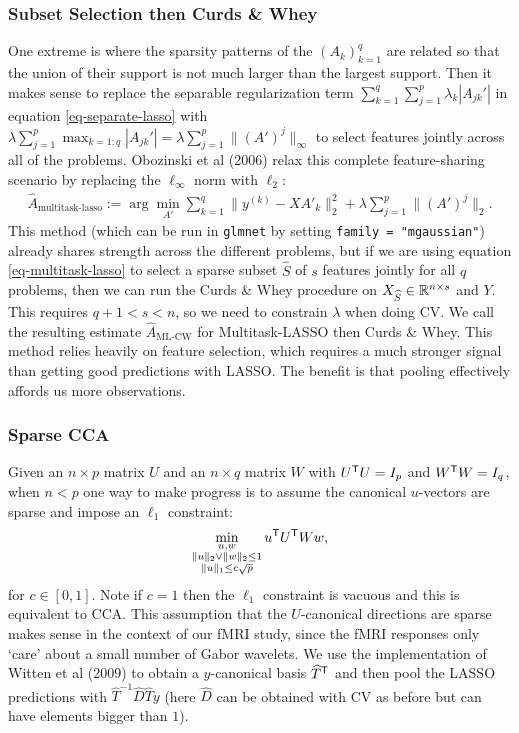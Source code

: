 \documentclass[main]{subfiles}
\begin{document}
\subsubsection{Subset Selection then Curds \& Whey}

One extreme is where the sparsity patterns of the $(A_k)_{k=1}^q$ are related so that the union of their support is not much larger than the largest support. Then it makes sense to replace the separable regularization term $\sum_{k=1}^q\sum_{j=1}^p \lambda_k|A_{jk}'|$ in equation \eqref{eq-separate-lasso} with $\lambda\sum_{j=1}^p \max_{k=1:q}|A_{jk}'| = \lambda\sum_{j=1}^p \|(A')^{j}\|_\infty$ to select features jointly across all of the problems. Obozinski et al (2006) relax this complete feature-sharing scenario by replacing the $\ell_\infty$ norm with $\ell_2$:
\begin{align}
\label{eq-multitask-lasso}
\widehat{A}_{\text{multitask-lasso}}
:= \arg\min_{A'}\sum_{k=1}^q\|y^{(k)} - XA'_k\|_2^2 +  \lambda\sum_{j=1}^p \|(A')^{j}\|_2.
\end{align}
This method (which can be run in \texttt{glmnet} by setting \texttt{family = "mgaussian"}) already shares strength across the different problems, but if we are using equation \eqref{eq-multitask-lasso} to select a sparse subset $\widehat{S}$ of $s$ features jointly for all $q$ problems, then we can run the Curds \& Whey procedure on $X_{\widehat{S}} \in \mathbb{R}^{n\times s}$ and $Y$. This requires $q+1 < s < n$, so we need to constrain $\lambda$ when doing CV. We call the resulting estimate $\widehat{A}_{\text{ML-CW}}$ for Multitask-LASSO then Curds \& Whey. This method relies heavily on feature selection, which requires a much stronger signal than getting good predictions with LASSO. The benefit is that pooling effectively affords us more observations. %

\subsubsection{Sparse CCA}
Given an $n\times p$ matrix $U$ and an $n\times q$ matrix $W$ with $U^\mathsf T U = I_p$ and $W^\mathsf T W = I_q$, when $n < p$ one way to make progress is to assume the canonical $u$-vectors are sparse and impose an $\ell_1$ constraint:
\begin{align}
\min_{\substack{u,w\\ \|u\|_2\lor \|w\|_2 \le 1 \\
     \|u\|_1 \le c\sqrt{p}}} u^\mathsf T U^\mathsf T W w,
\end{align}
for $c\in [0, 1]$. Note if $c = 1$ then the $\ell_1$ constraint is vacuous and this is equivalent to CCA. This assumption that the $U$-canonical directions are sparse makes sense in the context of our fMRI study, since the fMRI responses only `care' about a small number of Gabor wavelets. We use the implementation of Witten et al (2009) to obtain a $y$-canonical basis $\widehat{T}^\mathsf T$ and then pool the LASSO predictions with $\widehat{T}^{-1}\widehat{D}\widehat{T}y$ (here $\widehat{D}$ can be obtained with CV as before but can have elements bigger than $1$).
\end{document}
